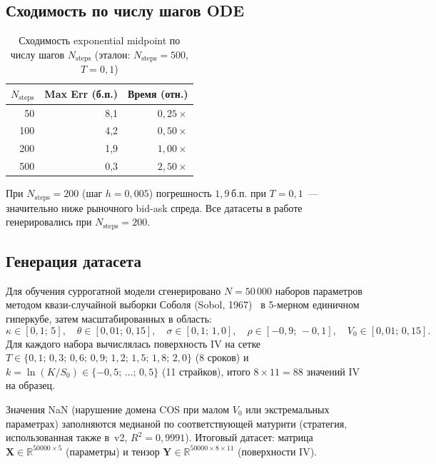 \subsection{Сходимость по числу шагов ODE}
\label{sec:ode_conv}

\begin{table}[H]
\centering
\caption{Сходимость exponential midpoint по числу шагов $N_{\text{steps}}$
         (эталон: $N_{\text{steps}}=500$, $T=0{,}1$)}
\label{tab:ode_conv}
\begin{tabular}{r r r}
\toprule
$N_{\text{steps}}$ & Max Err (б.п.) & Время (отн.) \\
\midrule
  50 & 8{,}1 & $0{,}25\times$ \\
 100 & 4{,}2 & $0{,}50\times$ \\
\rowcolor{tableblue}
 200 & 1{,}9 & $1{,}00\times$ \\
 500 & 0{,}3 & $2{,}50\times$ \\
\bottomrule
\end{tabular}
\end{table}

При $N_{\text{steps}}=200$ (шаг $h=0{,}005$) погрешность $1{,}9\,\text{б.п.}$
при $T=0{,}1$~--- значительно ниже рыночного bid-ask спреда.
Все датасеты в работе генерировались при $N_{\text{steps}}=200$.

\subsection{Генерация датасета}
\label{sec:dataset}

Для обучения суррогатной модели сгенерировано $N = 50\,000$ наборов параметров
методом квази-случайной выборки Соболя (Sobol, 1967)~\cite{Sobol1967}
в 5-мерном единичном гиперкубе, затем масштабированных в область:
\[
  \kappa \in [0{,}1;\,5],\quad
  \theta \in [0{,}01;\,0{,}15],\quad
  \sigma \in [0{,}1;\,1{,}0],\quad
  \rho \in [-0{,}9;\,-0{,}1],\quad
  V_0 \in [0{,}01;\,0{,}15].
\]
Для каждого набора вычислялась поверхность IV на сетке
$T \in \{0{,}1;\,0{,}3;\,0{,}6;\,0{,}9;\,1{,}2;\,1{,}5;\,1{,}8;\,2{,}0\}$
(8 сроков) и $k = \ln(K/S_0) \in \{-0{,}5;\,\ldots;\,0{,}5\}$ (11 страйков),
итого $8 \times 11 = 88$ значений IV на образец.

Значения NaN (нарушение домена COS при малом $V_0$ или экстремальных параметрах)
заполняются медианой по соответствующей матурити (стратегия, использованная
также в~v2, $R^2 = 0{,}9991$). Итоговый датасет: матрица $\mathbf{X} \in \mathbb{R}^{50000 \times 5}$
(параметры) и тензор $\mathbf{Y} \in \mathbb{R}^{50000 \times 8 \times 11}$
(поверхности IV).
